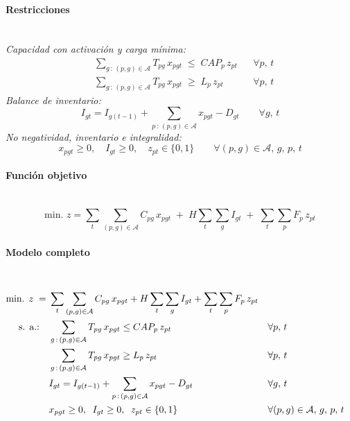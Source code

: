\paragraph{Restricciones}\mbox{}\\
\emph{Capacidad con activación y carga mínima:}
\begin{align}
    & \sum_{g\,:\,(p,g)\in\mathcal{A}} T_{pg}\, x_{pgt} \;\leq\; CAP_p\, z_{pt} && \forall p,\, t \\
    & \sum_{g\,:\,(p,g)\in\mathcal{A}} T_{pg}\, x_{pgt} \;\geq\; L_p\, z_{pt} && \forall p,\, t
\end{align}
\emph{Balance de inventario:}
\begin{equation}
    I_{gt} = I_{g(t-1)} + \sum_{p\,:\,(p,g)\in\mathcal{A}} x_{pgt} - D_{gt} \qquad \forall g,\, t
\end{equation}
\emph{No negatividad, inventario e integralidad:}
\begin{equation}
    x_{pgt} \geq 0,\quad I_{gt} \geq 0,\quad z_{pt} \in \{0,1\} \qquad \forall (p,g)\in\mathcal{A},\, g,\, p,\, t
\end{equation}

\paragraph{Función objetivo}\mbox{}\\
\begin{equation}
\mbox{min. } z = \sum_{t} \sum_{(p,g)\in\mathcal{A}} C_{pg}\, x_{pgt} \;+\; H \sum_{t}\sum_{g} I_{gt} \;+\; \sum_{t} \sum_{p} F_p\, z_{pt}
\end{equation}

\paragraph{Modelo completo}\mbox{}\\
\begin{align}
\mbox{min. } z \;=\;& \sum_{t}\sum_{(p,g)\in\mathcal{A}} C_{pg}\, x_{pgt} + H\sum_{t}\sum_{g} I_{gt} + \sum_{t}\sum_{p} F_p\, z_{pt} \notag\\
\mbox{s. a.:}\quad
& \sum_{g\,:\,(p,g)\in\mathcal{A}} T_{pg}\, x_{pgt} \leq CAP_p\, z_{pt} && \forall p,\, t \notag\\
& \sum_{g\,:\,(p,g)\in\mathcal{A}} T_{pg}\, x_{pgt} \geq L_p\, z_{pt} && \forall p,\, t \notag\\
& I_{gt} = I_{g(t-1)} + \sum_{p\,:\,(p,g)\in\mathcal{A}} x_{pgt} - D_{gt} && \forall g,\, t \notag\\
& x_{pgt} \geq 0,\;\; I_{gt} \geq 0,\;\; z_{pt}\in\{0,1\} && \forall (p,g)\in\mathcal{A},\, g,\, p,\, t \notag
\end{align}
